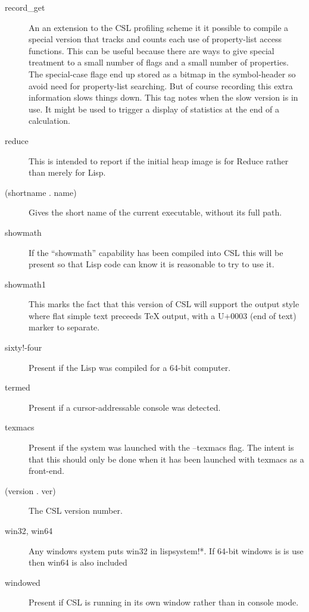 \documentclass[a4paper,11pt]{article}
\begin{document}
\begin{description}
\item[{\ttfamily  record\_get}] 
An an extension to the CSL profiling scheme it it possible to compile
a special version that tracks and counts each use of property-list access
functions. This can be useful because there are ways to give special
treatment to a small number of flags and a small number of properties. The
special-case flage end up stored as a bitmap in the symbol-header so avoid
need for property-list searching. But of course recording this extra
information slows things down. This tag notes when the slow version is
in use. It might be used to trigger a display of statistics at the end of
a calculation.

\item[{\ttfamily reduce}] 
This is intended to report if the initial heap image is for Reduce rather than
merely for Lisp.

\item[{\ttfamily  (shortname . name)}] 
Gives the short name of the current executable, without its full path.

\item[{\ttfamily showmath}] 
If the ``showmath'' capability has been compiled into CSL this will be present
so that Lisp code can know it is reasonable to try to use it.

\item[{\ttfamily showmath1}] 
This marks the fact that this version of CSL will support the output
style where flat simple text preceeds TeX output, with a U+0003 (end of text)
marker to separate.

\item[{\ttfamily  sixty!-four}] 
Present if the Lisp was compiled for a 64-bit computer.

\item[{\ttfamily termed}] 
Present if a cursor-addressable console was detected.

\item[{\ttfamily texmacs}] 
Present if the system was launched with the {\ttfamily --texmacs} flag.
The intent is that this should only be done when it has been launched with
texmacs as a front-end.

\item[{\ttfamily  (version . ver)}] 
The CSL version number.

\item[{\ttfamily win32}, {\ttfamily win64}] 
Any windows system puts {\ttfamily win32} in {\ttfamily lispsystem!*}.
If 64-bit windows is is use then {\ttfamily win64} is also included

\item[{\ttfamily windowed}] 
Present if CSL is running in its own window rather than in console mode.

\end{description} %
\end{document}
